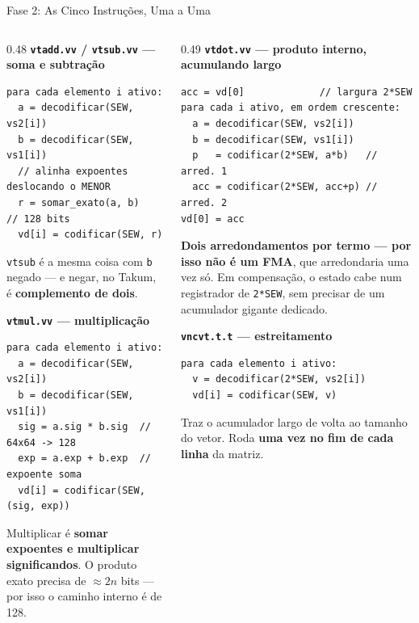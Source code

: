\documentclass[aspectratio=169,10pt]{beamer}
\begin{document}
\begin{frame}[fragile]{Fase 2: As Cinco Instruções, Uma a Uma}
	\scriptsize
	\begin{columns}[T,onlytextwidth]
		\begin{column}{0.48\textwidth}
			\textbf{\texttt{vtadd.vv} / \texttt{vtsub.vv} --- soma e subtração}
\begin{verbatim}
para cada elemento i ativo:
  a = decodificar(SEW, vs2[i])
  b = decodificar(SEW, vs1[i])
  // alinha expoentes deslocando o MENOR
  r = somar_exato(a, b)   // 128 bits
  vd[i] = codificar(SEW, r)
\end{verbatim}
			\texttt{vtsub} é a mesma coisa com \texttt{b} negado --- e negar, no Takum, é \textbf{complemento de dois}.
			\vspace{0.6em}

			\textbf{\texttt{vtmul.vv} --- multiplicação}
\begin{verbatim}
para cada elemento i ativo:
  a = decodificar(SEW, vs2[i])
  b = decodificar(SEW, vs1[i])
  sig = a.sig * b.sig  // 64x64 -> 128
  exp = a.exp + b.exp  // expoente soma
  vd[i] = codificar(SEW, (sig, exp))
\end{verbatim}
			Multiplicar é \textbf{somar expoentes e multiplicar significandos}. O produto exato precisa de $\approx 2n$ bits --- por isso o caminho interno é de 128.
		\end{column}
		\begin{column}{0.49\textwidth}
			\textbf{\texttt{vtdot.vv} --- produto interno, acumulando largo}
\begin{verbatim}
acc = vd[0]             // largura 2*SEW
para cada i ativo, em ordem crescente:
  a = decodificar(SEW, vs2[i])
  b = decodificar(SEW, vs1[i])
  p   = codificar(2*SEW, a*b)   // arred. 1
  acc = codificar(2*SEW, acc+p) // arred. 2
vd[0] = acc
\end{verbatim}
			\textbf{\textcolor{red!70!black}{Dois arredondamentos por termo --- por isso não é um FMA}}, que arredondaria uma vez só. Em compensação, o estado cabe num registrador de \texttt{2*SEW}, sem precisar de um acumulador gigante dedicado.
			\vspace{0.6em}

			\textbf{\texttt{vncvt.t.t} --- estreitamento}
\begin{verbatim}
para cada elemento i ativo:
  v = decodificar(2*SEW, vs2[i])
  vd[i] = codificar(SEW, v)
\end{verbatim}
			Traz o acumulador largo de volta ao tamanho do vetor. Roda \textbf{uma vez no fim de cada linha} da matriz.
		\end{column}
	\end{columns}
\end{frame}
\end{document}
